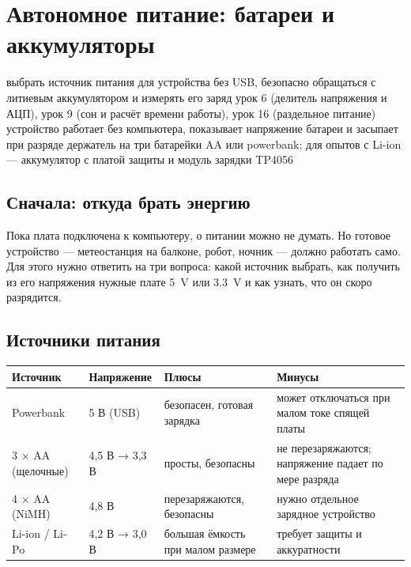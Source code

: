 \section{Автономное питание: батареи и аккумуляторы}
\lessonintro
  {выбрать источник питания для устройства без USB, безопасно обращаться с литиевым аккумулятором и измерять его заряд}
  {урок 6 (делитель напряжения и АЦП), урок 9 (сон и расчёт времени работы), урок 16 (раздельное питание)}
  {устройство работает без компьютера, показывает напряжение батареи и засыпает при разряде}
  {держатель на три батарейки AA или powerbank; для опытов с Li-ion --- аккумулятор с платой защиты и модуль зарядки TP4056}

\subsection{Сначала: откуда брать энергию}

Пока плата подключена к компьютеру, о питании можно не думать. Но готовое устройство --- метеостанция
на балконе, робот, ночник --- должно работать само. Для этого нужно ответить на три вопроса: какой
источник выбрать, как получить из его напряжения нужные плате \SI{5}{V} или \SI{3.3}{V} и как узнать,
что он скоро разрядится.

\subsection{Источники питания}

\begin{center}\small
\begin{tabularx}{\textwidth}{@{}l l X X@{}}
\toprule
Источник & Напряжение & Плюсы & Минусы \\
\midrule
Powerbank & 5 В (USB) & безопасен, готовая зарядка & может отключаться при малом токе спящей платы \\
3 × AA (щелочные) & 4,5 В → 3,3 В & просты, безопасны & не перезаряжаются; напряжение падает по мере разряда \\
4 × AA (NiMH) & 4,8 В & перезаряжаются, безопасны & нужно отдельное зарядное устройство \\
Li-ion / Li-Po & 4,2 В → 3,0 В & большая ёмкость при малом размере & требует защиты и аккуратности \\
\bottomrule
\end{tabularx}
\end{center}

